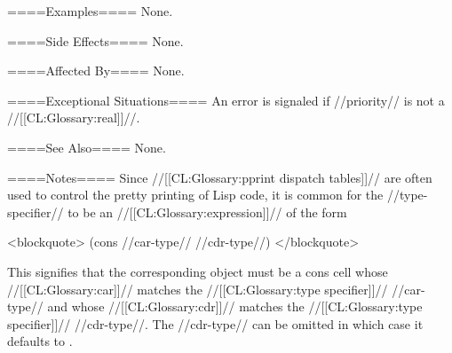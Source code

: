 ====Examples====
None.

====Side Effects====
None.

====Affected By====
None.

====Exceptional Situations====
An error is signaled if //priority// is not a //[[CL:Glossary:real]]//.

====See Also====
None.

====Notes====
Since //[[CL:Glossary:pprint dispatch tables]]// are often used to control the pretty printing of Lisp code, it is common for the //type-specifier// to be an //[[CL:Glossary:expression]]// of the form

<blockquote> (cons //car-type// //cdr-type//) </blockquote>

This signifies that the corresponding object must be a cons cell whose //[[CL:Glossary:car]]// matches the //[[CL:Glossary:type specifier]]// //car-type// and whose //[[CL:Glossary:cdr]]// matches the //[[CL:Glossary:type specifier]]// //cdr-type//. The //cdr-type// can be omitted in which case it defaults to .

